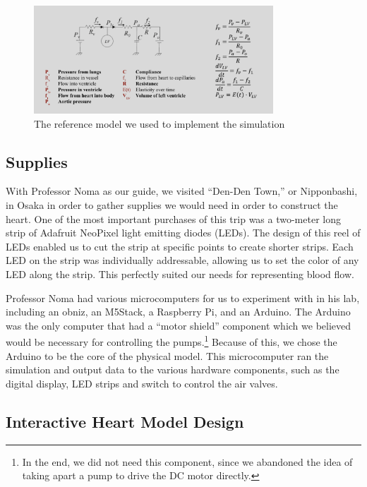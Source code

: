 \documentclass[a4paper, 10pt, american, titlepage]{article}
\begin{document}
\begin{figure}[h] \centering
    \includegraphics[width=0.8\textwidth]{reference-model.png}
    \caption{The reference model we used to implement the simulation}
    \label{fig:referenceModel}
\end{figure}

\subsection{Supplies}
\label{sec:supplies}

With Professor Noma as our guide, we visited ``Den-Den Town,'' or Nipponbashi,
in Osaka in order to gather supplies we would need in order to construct the
heart. One of the most important purchases of this trip was a two-meter long
strip of Adafruit NeoPixel light emitting diodes (LEDs). The design of this reel
of LEDs enabled us to cut the strip at specific points to create shorter strips.
Each LED on the strip was individually addressable, allowing us to set the color
of any LED along the strip. This perfectly suited our needs for representing
blood flow.

Professor Noma had various microcomputers for us to experiment with in his lab,
including an obniz, an M5Stack, a Raspberry Pi, and an Arduino. The Arduino was
the only computer that had a ``motor shield'' component which we believed would
be necessary for controlling the pumps.\footnote{In the end, we did not need
this component, since we abandoned the idea of taking apart a pump to drive the
DC motor directly.} Because of this, we chose the Arduino to be the core of the
physical model. This microcomputer ran the simulation and output data to the
various hardware components, such as the digital display, LED strips and switch
to control the air valves.

\subsection{Interactive Heart Model Design}
\label{sec:interactiveModelDesign}
\end{document}
